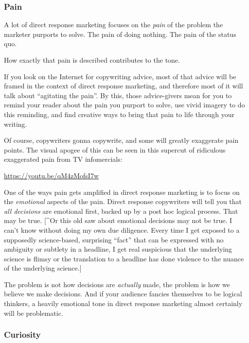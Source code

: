 \documentclass[13pt,]{tufte-handout}
\begin{document}
\hypertarget{pain}{%
\subsubsection{Pain}\label{pain}}

A lot of direct response marketing focuses on the \emph{pain} of the
problem the marketer purports to solve. The pain of doing nothing. The
pain of the status quo.

How exactly that pain is described contributes to the tone.

If you look on the Internet for copywriting advice, most of that advice
will be framed in the context of direct response marketing, and
therefore most of it will talk about ``agitating the pain''. By this,
those advice-givers mean for you to remind your reader about the pain
you purport to solve, use vivid imagery to do this reminding, and find
creative ways to bring that pain to life through your writing.

Of course, copywriters gonna copywrite, and some will greatly exaggerate
pain points. The visual apogee of this can be seen in this supercut of
ridiculous exaggerated pain from TV infomercials:

\url{https://youtu.be/qM4zMofsI7w}

One of the ways pain gets amplified in direct response marketing is to
focus on the \emph{emotional} aspects of the pain. Direct response
copywriters will tell you that \emph{all decisions} are emotional first,
backed up by a post hoc logical process. That may be true. {[}\^{}Or
this old saw about emotional decisions may not be true. I can't know
without doing my own due diligence. Every time I get exposed to a
supposedly science-based, surprising ``fact'' that can be expressed with
no ambiguity or subtlety in a headline, I get real suspicious that the
underlying science is flimsy or the translation to a headline has done
violence to the nuance of the underlying science.{]}

The problem is not how decisions are \emph{actually} made, the problem
is how we believe we make decisions. And if your audience fancies
themselves to be logical thinkers, a heavily emotional tone in direct
response marketing almost certainly will be problematic.

\hypertarget{curiosity}{%
\subsubsection{Curiosity}\label{curiosity}}
\end{document}
